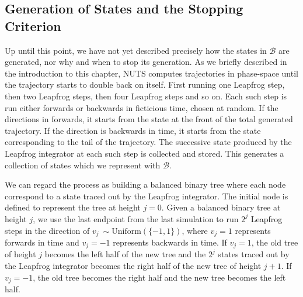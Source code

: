 \subsection{Generation of States and the Stopping Criterion}
Up until this point, we have not yet described precisely how the states in $\mathcal{B}$ are generated,
nor why and when to stop its generation. As we briefly described in the introduction to this chapter, 
NUTS computes trajectories in phase-space until the trajectory starts to double back on itself. First running one Leapfrog step,
then two Leapfrog steps, then four Leapfrog steps and so on. Each such step is run either forwards or backwards in ficticious time, chosen at random.
If the directions in forwards, it starts from the state at the front of the total generated trajectory. If the direction is backwards in time, it starts from the state corresponding to the tail of the trajectory.
The successive state produced by the Leapfrog integrator at each such step is collected and stored. This generates a collection of states which we represent with $\mathcal{B}$. 

We can regard the process as building a balanced binary tree where each node correspond to a state traced out by the Leapfrog integrator. The initial node is defined to represent the tree at height $j = 0$. Given a balanced binary tree at height $j$, we use the last endpoint from the last simulation to run $2^j$ Leapfrog steps in the direction of $v_j ~ \sim \text{Uniform}(\{-1, 1\})$, where $v_j = 1$ represents forwards in time and $v_j = -1$ represents backwards in time.
If $v_j = 1$, the old tree of height $j$ becomes the left half of the new tree and the $2^j$ states traced out by the Leapfrog integrator becomes the right half of the new tree of height $j + 1$. If $v_j = -1$, the old tree becomes the right half and the new tree becomes the left half. 

